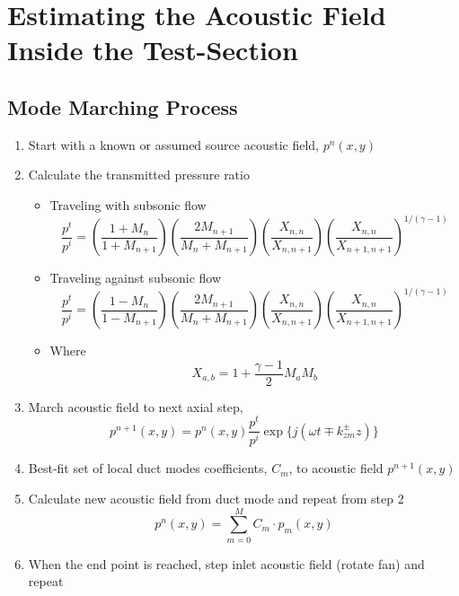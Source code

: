 \section{Estimating the Acoustic Field Inside the Test-Section}



\subsection{Mode Marching Process}
\begin{enumerate}
  \item Start with a known or assumed source acoustic field, $p^n(x,y)$

  \item Calculate the transmitted pressure ratio
  \begin{itemize}
    \item Traveling with subsonic flow
      \begin{equation}
        \frac{p^t}{p^i} = \left(\frac{1+M_n}{1+M_{n+1}}\right)\left(\frac{2M_{n+1}}{M_n+M_{n+1}}\right)\left(\frac{X_{n,n}}{X_{n,n+1}}\right)\left(\frac{X_{n,n}}{X_{n+1,n+1}}\right)^{1/(\gamma-1)}
      \end{equation}
    \item Traveling against subsonic flow
      \begin{equation}
        \frac{p^t}{p^i} = \left(\frac{1-M_n}{1-M_{n+1}}\right)\left(\frac{2M_{n+1}}{M_n+M_{n+1}}\right)\left(\frac{X_{n,n}}{X_{n,n+1}}\right)\left(\frac{X_{n,n}}{X_{n+1,n+1}}\right)^{1/(\gamma-1)}
      \end{equation}
    \item Where
      \begin{equation}
        X_{a,b} = 1+\frac{\gamma-1}{2}M_aM_b
      \end{equation}
  \end{itemize}

  \item March acoustic field to next axial step,
    \begin{equation}
      p^{n+1}(x,y) = p^{n}(x,y)\frac{p^t}{p^i}\exp\{j(\omega t\mp k_{zm}^\pm z)\}
    \end{equation}

  \item Best-fit set of local duct modes coefficients, $C_m$, to acoustic field $p^{n+1}(x,y)$

  \item Calculate new acoustic field from duct mode and repeat from step 2
    \begin{equation}
      p^n(x,y) = \sum_{m=0}^{M} C_m\cdot p_m(x,y)
    \end{equation}

  \item When the end point is reached, step inlet acoustic field (rotate fan) and repeat
\end{enumerate}
